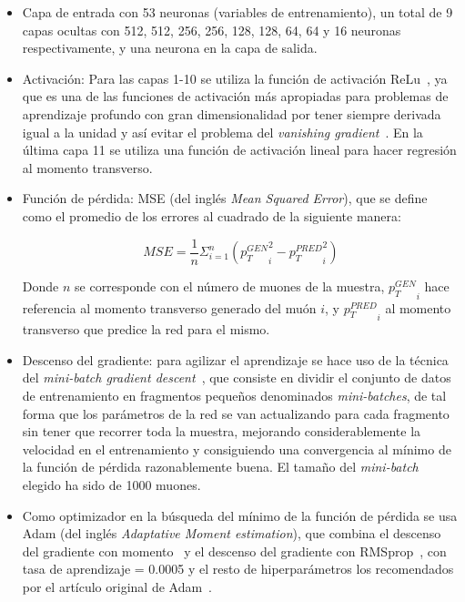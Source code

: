 \begin{itemize}

\item Capa de entrada con 53 neuronas (variables de entrenamiento), un total de 9 capas ocultas con 512, 512, 256, 256, 128, 128, 64, 64 y 16 neuronas respectivamente, y una neurona en la capa de salida.

\item Activaci\'on: Para las capas 1-10 se utiliza la funci\'on de activaci\'on ReLu~\cite{agarap2018deep}, ya que es una de las funciones de activaci\'on m\'as apropiadas para problemas de aprendizaje profundo con gran dimensionalidad por tener siempre derivada igual a la unidad y as\'i evitar el problema del \textit{vanishing gradient}~\cite{Hochreiter:91}. En la \'ultima capa 11 se utiliza una funci\'on de activaci\'on lineal para hacer regresi\'on al momento transverso.

\item Funci\'on de p\'erdida: MSE (del ingl\'es \textit{Mean Squared Error}), que se define como el promedio de los errores al cuadrado de la siguiente manera:

\begin{equation}
  MSE = \frac{1}{n}\Sigma_{i=1}^{n}{\left({p_{T}^{GEN}}_i^2 - {p_{T}^{PRED}}_i^2\right)}
\label{eq:MSE}
\end{equation}

Donde $n$ se corresponde con el n\'umero de muones de la muestra, ${p_{T}^{GEN}}_i$ hace referencia al momento transverso generado del mu\'on $i$, y ${p_{T}^{PRED}}_i$ al momento transverso que predice la red para el mismo. 

\item Descenso del gradiente: para agilizar el aprendizaje se hace uso de la t\'ecnica del \textit{mini-batch gradient descent}~\cite{perrone2019optimal}, que consiste en dividir el conjunto de datos de entrenamiento en fragmentos peque\~nos denominados \textit{mini-batches}, de tal forma que los par\'ametros de la red se van actualizando para cada fragmento sin tener que recorrer toda la muestra, mejorando considerablemente la velocidad en el entrenamiento y consiguiendo una convergencia al m\'inimo de la funci\'on de p\'erdida razonablemente buena. El tama\~no del \textit{mini-batch} elegido ha sido de 1000 muones.

\item Como optimizador en la b\'usqueda del m\'inimo de la funci\'on de p\'erdida se usa Adam (del ingl\'es \textit{Adaptative Moment estimation}), que combina el descenso del gradiente con momento~\cite{PMID:12662723} y el descenso del gradiente con RMSprop~\cite{tieleman2012lecture}, con tasa de aprendizaje = 0.0005 y el resto de hiperpar\'ametros los recomendados por el art\'iculo original de Adam~\cite{Kingma2015AdamAM}.


\end{itemize}
